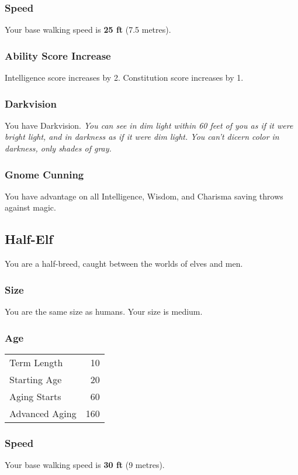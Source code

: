 \documentclass[10pt,twoside]{article}
\begin{document}
\begin{multicols}{2}
\subsubsection*{Speed}
Your base walking speed is \textbf{25 ft} (7.5 metres).

\subsubsection*{Ability Score Increase}
Intelligence score increases by 2.
Constitution score increases by 1.

\subsubsection*{Darkvision}
You have Darkvision.
\textit{You can see in dim light within 60 feet of you as if it were bright light, and in darkness as if it were dim light. You can’t dicern color in darkness, only shades of gray.}

\subsubsection*{Gnome Cunning}
You have advantage on all Intelligence, Wisdom, and Charisma saving throws against magic.


\subsection{Half-Elf}

You are a half-breed, caught between the worlds of elves and men.

\subsubsection*{Size}
You are the same size as humans. Your size is medium.

\subsubsection*{Age}
\begin{tabular}{ l r }
  Term Length & 10 \\
  Starting Age & 20 \\
  Aging Starts & 60 \\
  Advanced Aging & 160 \\
\end{tabular}

\subsubsection*{Speed}
Your base walking speed is \textbf{30 ft} (9 metres).


\end{multicols}
\end{document}
